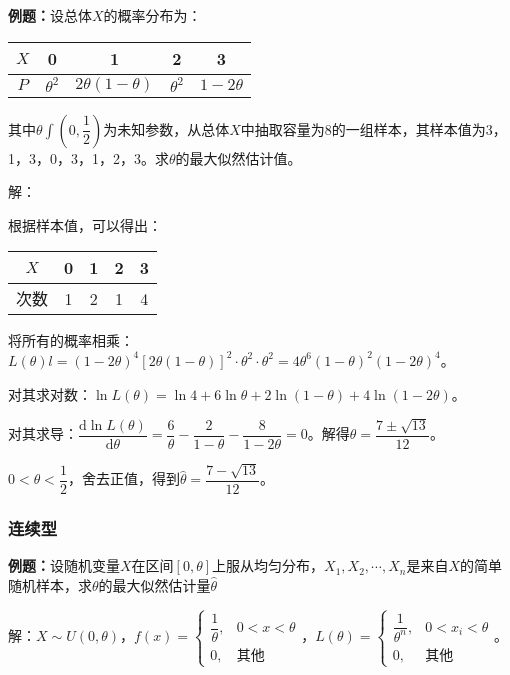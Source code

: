 \textbf{例题：}设总体$X$的概率分布为：\medskip

\begin{tabular}{c|cccc}
    \hline
    $X$ & 0 & 1 & 2 & 3 \\ \hline
    $P$ & $\theta^2$ & $2\theta(1-\theta)$ & $\theta^2$ & $1-2\theta$ \\ \hline
\end{tabular} \medskip

其中$\theta\int\left(0,\dfrac{1}{2}\right)$为未知参数，从总体$X$中抽取容量为8的一组样本，其样本值为3，1，3，0，3，1，2，3。求$\theta$的最大似然估计值。

解：

根据样本值，可以得出：\medskip

\begin{tabular}{c|cccc}
    \hline
    $X$ & 0 & 1 & 2 & 3 \\ \hline
    次数 & 1 & 2 & 1 & 4 \\ \hline
\end{tabular} \medskip

将所有的概率相乘：$L(\theta)l=(1-2\theta)^4[2\theta(1-\theta)]^2\cdot\theta^2\cdot\theta^2=4\theta^6(1-\theta)^2(1-2\theta)^4$。

对其求对数：$\ln L(\theta)=\ln4+6\ln\theta+2\ln(1-\theta)+4\ln(1-2\theta)$。

对其求导：$\dfrac{\textrm{d}\ln L(\theta)}{\textrm{d}\theta}=\dfrac{6}{\theta}-\dfrac{2}{1-\theta}-\dfrac{8}{1-2\theta}=0$。解得$\theta=\dfrac{7\pm\sqrt{13}}{12}$。

$0<\theta<\dfrac{1}{2}$，舍去正值，得到$\hat{\theta}=\dfrac{7-\sqrt{13}}{12}$。

\subsubsection{连续型}

\textbf{例题：}设随机变量$X$在区间$[0,\theta]$上服从均匀分布，$X_1,X_2,\cdots,X_n$是来自$X$的简单随机样本，求$\theta$的最大似然估计量$\hat{\theta}$

解：$X\sim U(0,\theta)$，$f(x)=\left\{\begin{array}{ll}
    \dfrac{1}{\theta}, & 0<x<\theta \\
    0, & \text{其他}
\end{array}\right.$，$L(\theta)=\left\{\begin{array}{ll}
    \dfrac{1}{\theta^n}, & 0<x_i<\theta \\
    0, & \text{其他}
\end{array}\right.$。

